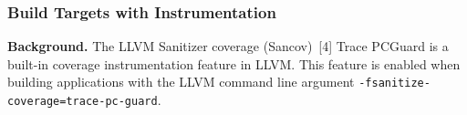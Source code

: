 \documentclass[letterpaper,11pt]{article}
\begin{document}











\subsubsection{Build Targets with Instrumentation}

\textbf{Background.}
The LLVM Sanitizer coverage (Sancov)~[4] Trace PCGuard is a built-in coverage instrumentation feature in LLVM.
This feature is enabled when building applications with the LLVM command line argument \texttt{-fsanitize-coverage=trace-pc-guard}.
\end{document}
